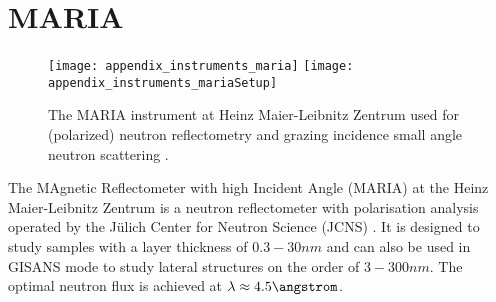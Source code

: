 \documentclass[\main/dresen_thesis.tex]{subfiles}
\begin{document}
  \section{MARIA}\label{ch:lss:maria}
    \begin{figure}[ht]
      \centering
      \texttt{[image: appendix\_instruments\_maria]}
      \texttt{[image: appendix\_instruments\_mariaSetup]}
      \caption{\label{fig:lss:maria}The MARIA instrument at Heinz Maier-Leibnitz Zentrum used for (polarized) neutron reflectometry and grazing incidence small angle neutron scattering \cite{Heinz_2015_Maria}.}
    \end{figure}

    The MAgnetic Reflectometer with high Incident Angle (MARIA) at the Heinz Maier-Leibnitz Zentrum is a neutron reflectometer with polarisation analysis operated by the J\"ulich Center for Neutron Science (JCNS) \cite{Heinz_2015_Maria}.
    It is designed to study samples with a layer thickness of $0.3 - 30 \unit{nm}$ and can also be used in GISANS mode to study lateral structures on the order of $3 - 300 \unit{nm}$.
    The optimal neutron flux is achieved at $\lambda \approx 4.5 \angstrom$.
\end{document}
